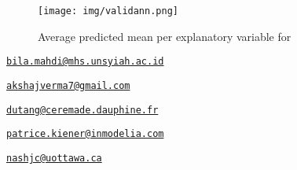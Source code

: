 \begin{figure}
    \texttt{[image: img/validann.png]}
        \label{fig:validann}
        \caption{Average predicted mean per explanatory variable for }
\end{figure}


\address{%
Salsabila Mahdi\\
Universitas Syiah Kuala\\
JL. Syech Abdurrauf No.3, Aceh 23111, Indonesia\\
}
\href{mailto:bila.mahdi@mhs.unsyiah.ac.id}{\nolinkurl{bila.mahdi@mhs.unsyiah.ac.id}}

\address{%
Akshaj Verma\\
Manipal Institute of Technology\\
Manipal, Karnataka, 576104, India\\
}
\href{mailto:akshajverma7@gmail.com}{\nolinkurl{akshajverma7@gmail.com}}

\address{%
Christophe Dutang\\
Université Paris-Dauphine, University PSL, CNRS, CEREMADE\\
Place du Maréchal de Lattre de Tassigny, 75016 Paris, France\\
}
\href{mailto:dutang@ceremade.dauphine.fr}{\nolinkurl{dutang@ceremade.dauphine.fr}}

\address{%
Patrice Kiener\\
InModelia\\
5 rue Malebranche, 75005 Paris, France\\
}
\href{mailto:patrice.kiener@inmodelia.com}{\nolinkurl{patrice.kiener@inmodelia.com}}

\address{%
John C. Nash\\
Telfer School of Management, University of Ottawa\\
55 Laurier Avenue East, Ottawa, Ontario K1N 6N5 Canada\\
}
\href{mailto:nashjc@uottawa.ca}{\nolinkurl{nashjc@uottawa.ca}}

